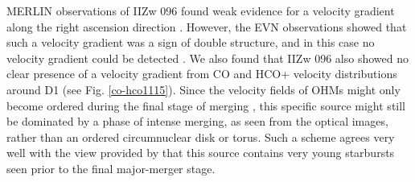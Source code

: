 \documentclass[]{aa} %
\begin{document}
MERLIN observations of IIZw 096 found weak evidence for a velocity gradient along the right ascension direction \citep{2011MNRAS.416.1267M}. However, the EVN observations showed that such a velocity gradient was a sign of double structure, and in this case no velocity gradient could be detected \citep[see][]{2010PhDT.......280C}. We also found that IIZw 096 also showed no clear presence of a velocity gradient from CO and HCO+ velocity distributions around D1 (see Fig. \ref{co-hco1115}). Since the velocity fields of OHMs might only become ordered during the final stage of merging \citep{2020A&A...638A..78P},  this specific source might still be dominated by a phase of intense merging, as seen from the optical images, rather than an ordered circumnuclear disk or torus. Such a scheme agrees very well with the view provided by \cite{1997AJ....113.1569G} that this source contains very young starbursts seen prior to the final major-merger stage.
\end{document}
